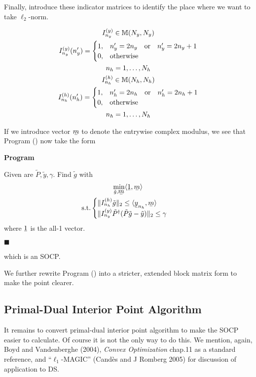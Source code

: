 \documentclass[12pt]{article}
\newcommand{\MB}[1]{\mathbb{#1}}
\newcommand{\RM}[1]{\mathrm{#1}}
\newcommand{\V}[1]{\stackunder[1.2pt]{$#1$}{\rule{.9ex}{.075ex}}}
\newcommand{\T}[1]{\tilde{#1}}
\newcommand{\IP}[1]{\langle #1 \rangle}
\renewcommand{\H}{\dagger}
\newcounter{NumResult}
\newcommand{\myCount}
{
   \stepcounter{NumResult}
   \textbf{\arabic{NumResult}}
}
\newcommand {\Result} [2]
{
   \bigskip
   \myCount \textbf{#1} \par
   {#2} \par
   \hfill \(\blacksquare\)
   \bigskip
}
\begin{document}
Finally, introduce these indicator matrices to identify the place where we want to take \(\ell_2\)-norm.

\begin{gather}
I_{n_y}^{(y)} \in \MB{M}(N_y, N_y) \\
I_{n_y}^{(y)}(n_y')
=\begin{cases}
1, &n_y' =2n_y \quad \RM{or} \quad n_y' =2n_y+1 \notag \\
0, &\RM{otherwise}
\end{cases} \\
n_h =1, \dotsc, N_h \notag \\
I_{n_h}^{(h)} \in \MB{M}(N_h, N_h) \\
I_{n_h}^{(h)}(n_h')
=\begin{cases}
1, &n_h' =2n_h \quad \RM{or} \quad n_h' =2n_h+1 \notag \\
0, &\RM{otherwise}
\end{cases} \\
n_h =1, \dotsc, N_h \notag
\end{gather}

If we introduce vector \(\V{m}\) to denote the entrywise complex modulus, we see that Program () now take the form

\Result
{Program}
{
Given are \(\T{P}, \T{y}, \gamma\).
Find \(\T{g}\) with
\begin{gather}
   \min_{\T{g}, \V{m}} \IP{ \V{1}, \V{m} } \notag \\
\RM{s.t.}
\begin{cases}
\| I_{n_h}^{(h)} \T{g} \|_2
   \leq \IP{ \V{y}_{n_h}, \V{m} } \\
\| I_{n_y}^{(y)} \T{P}^\H ( \T{P} \T{g} - \T{y} ) \|_2
\leq \gamma  \\
\end{cases}
\end{gather}
where \(\V{1}\) is the all-1 vector.
}

which is an SOCP.

We further rewrite Program () into a stricter, extended block matrix form to make the point clearer.

\subsection{Primal-Dual Interior Point Algorithm}

It remains to convert primal-dual interior point algorithm to make the SOCP easier to calculate.
Of course it is not the only way to do this.
We mention, again, Boyd and Vandenberghe (2004), \textit{Convex Optimization} chap.11 as a standard reference, and ``\(\ell_1\)-MAGIC'' (Cand\`es and J Romberg 2005) for discussion of application to DS.
\end{document}
